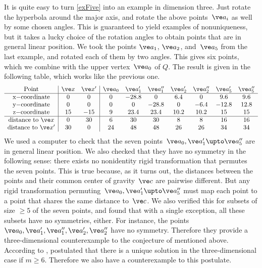 \documentclass[reqno]{amsart}
\begin{document}
\begin{ex} \label{ex3D}%
  It is quite easy to turn \cref{exFive} into an example in dimension
  three. Just rotate the hyperbola around the major axis, and rotate
  the above points~$\ve a_i$ as well by some chosen angles. This is
  guaranteed to yield examples of nonuniqueness, but it takes a lucky
  choice of the rotation angles to obtain points that are in general
  linear position. We took the points $\ve a_1$, $\ve a_2$,
  and~$\ve a_5$ from the last example, and rotated each of them by two
  angles. This gives six points, which we combine with the upper
  vertex~$\ve a_0$ of $Q$. The result is given in the following table,
  which works like the previous one.
  \[
    \begin{array}{c|cc|ccccccc}
      \text{Point} & \ve x & \ve x' & \ve a_0 & \ve a_1' & \ve a_1'' &
      \ve a_2' & \ve a_2'' & \ve a_5' & \ve a_5'' \\ \hline
      $x$-\text{coordinate} & 0 & 0 & 0 & -28.8 & 0 & 6.4 & 0 & 9.6 &
                                                                      9.6 \\
      $y$-\text{coordinate} & 0 & 0 & 0 & 0 & -28.8 & 0 & -6.4 & -12.8
                             & 12.8 \\ 
      $z$-\text{coordinate} & 15 & -15 & 9 & 23.4 & 23.4 & 10.2 & 10.2
                  & 15 & 15 \\ \hline
      \text{distance to} \ \ve x & 0 & 30 & 6 & 30 & 30 & 8 & 8 & 16 &
                                                                       16 \\
      \text{distance to} \ \ve x' & 30 & 0 & 24 & 48 & 48 & 26 & 26 &
                                                                      34 & 34
    \end{array} 
  \]
  We used a computer to check that the seven
  points~$\ve a_0,\ve a_1' \upto \ve a_5''$ are in general linear
  position. We also checked that they have no symmetry in the
  following sense: there exists no nonidentity rigid transformation
  that permutes the seven points. This is true because, as it turns
  out, the distances between the points and their common center of
  gravity~$\ve c$ are pairwise different. But any rigid transformation
  permuting~$\ve a_0,\ve a_1' \upto \ve a_5''$ must map each point to
  a point that shares the same distance to~$\ve c$. We also verified
  this for subsets of size $\ge 5$ of the seven points, and found that
  with a single exception, all these subsets have no symmetries,
  either. For instance, the points
  $\ve a_0,\ve a_1',\ve a_1'',\ve a_2',\ve a_2''$ have no
  symmetry. Therefore they provide a three-dimensional counterexample to
  the conjecture of  mentioned above. According to ,  postulated that there is a unique solution in the three-dimensional case if $m \ge 6$. Therefore we also have a counterexample to this postulate.


\end{ex}
\end{document}
